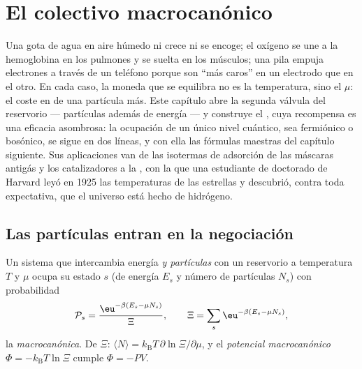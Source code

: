 \chapter{El colectivo macrocanónico}\label{ch:b3:grand-canonical}

Una gota de agua en aire húmedo ni crece ni se encoge; el oxígeno se une a
la hemoglobina en los pulmones y se suelta en los músculos; una pila empuja
electrones a través de un teléfono porque son ``más caros'' en un electrodo
que en el otro. En cada caso, la moneda que se equilibra no es la
temperatura, sino el \emph{} $\mu$: el coste en  de una partícula más. Este capítulo abre la segunda válvula del
reservorio --- partículas además de energía --- y construye el , cuya recompensa es una eficacia asombrosa: la ocupación de un
único nivel cuántico, sea fermiónico o bosónico, se sigue en dos líneas, y
con ella las fórmulas maestras del capítulo siguiente. Sus aplicaciones van
de las isotermas de adsorción de las máscaras antigás y los catalizadores a
la , con la que una estudiante de doctorado de Harvard leyó
en 1925 las temperaturas de las estrellas y descubrió, contra toda
expectativa, que el universo está hecho de hidrógeno.

\section{Las partículas entran en la negociación}

\begin{theorem}\label{thm:b3:grand-canonical:distribution}
Un sistema que intercambia energía \emph{y partículas} con un reservorio a
temperatura $T$ y  $\mu$ ocupa su estado $s$
(de energía $E_s$ y número de partículas $N_s$) con probabilidad
\[
\mathcal P_s = \frac{\eu^{-\beta(E_s - \mu N_s)}}{\Xi} , \qquad
\Xi = \sum_s\eu^{-\beta(E_s - \mu N_s)} ,
\]
la \emph{ macrocanónica}. De $\Xi$: $\langle N\rangle
= k_{\text{B}}T\,\partial\ln\Xi/\partial\mu$, y el \emph{potencial
macrocanónico} $\Phi = -k_{\text{B}}T\ln\Xi$ cumple $\Phi = -PV$.
\end{theorem}


